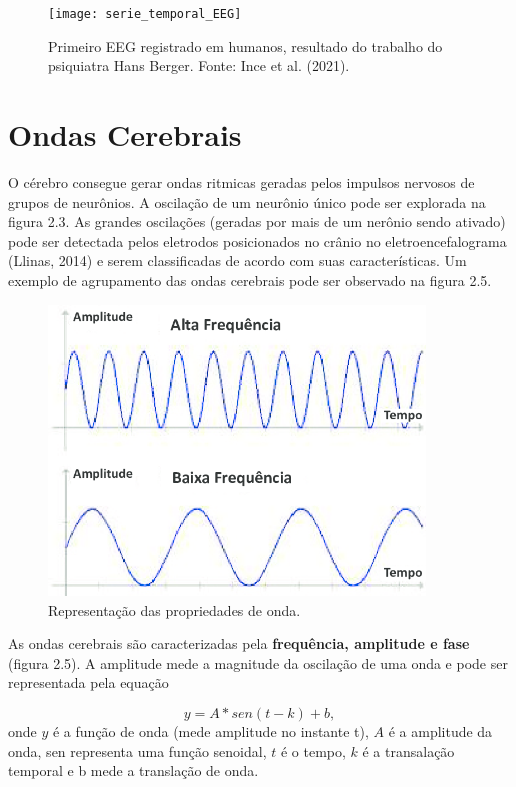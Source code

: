   \begin{figure}[h]
    \centering
    \texttt{[image: serie\_temporal\_EEG]}
    \caption[]{Primeiro EEG registrado em humanos, resultado do trabalho do psiquiatra Hans Berger. Fonte: Ince et al. (2021).} 
    \end{figure}

\section{Ondas Cerebrais}
O cérebro consegue gerar ondas ritmicas geradas pelos impulsos nervosos de grupos de neurônios. 
A oscilação de um neurônio único pode ser explorada na figura 2.3. As grandes oscilações (geradas por 
mais de um nerônio sendo ativado) pode ser detectada pelos eletrodos posicionados 
no crânio no eletroencefalograma (Llinas, 2014) e serem classificadas de acordo com suas características.
Um exemplo de agrupamento das ondas cerebrais pode ser observado na figura 2.5. 

\begin{figure}[h]
    \centering
    \includegraphics[width=100mm]{propriedades de onda.png}
    \caption[]{Representação das propriedades de onda.} 
    \end{figure}

As ondas cerebrais são caracterizadas pela \textbf{frequência, amplitude e fase} (figura 2.5). 
A amplitude mede a magnitude da oscilação de uma onda e pode ser representada pela equação

\begin{equation}
    y = A * sen (t - k) + b,
\end{equation}
onde $y$ é a função de onda (mede amplitude no instante t), $A$ é a amplitude da onda, sen representa
uma função senoidal, $t$ é o tempo, $k$ é a transalação temporal e b mede a translação de onda. 


